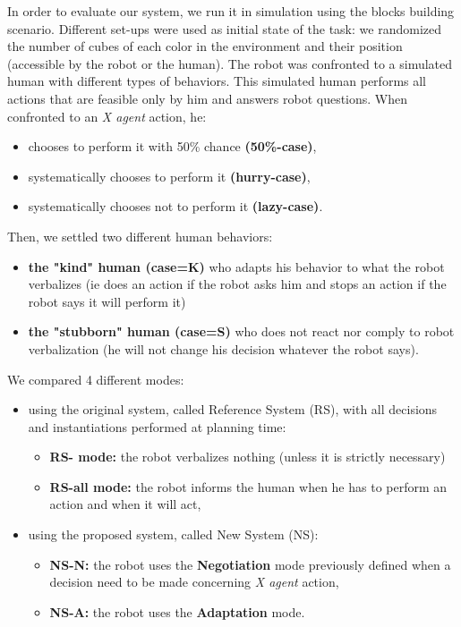 \documentclass[english,a4paper,11pt,twoside]{StyleThese}
\begin{document}
In order to evaluate our system, we run it in simulation using the blocks building scenario. Different set-ups were used as initial state of the task: we randomized the number of cubes of each color in the environment and their position (accessible by the robot or the human). The robot was confronted to a simulated human with different types of behaviors. This simulated human performs all actions that are feasible only by him and answers robot questions. When confronted to an \textit{X agent} action, he:
\begin{itemize}
\item chooses to perform it with 50\% chance \textbf{(50\%-case)},
\item systematically chooses to perform it \textbf{(hurry-case)},
\item systematically chooses not to perform it \textbf{(lazy-case)}.
\end{itemize}
Then, we settled two different human behaviors:
\begin{itemize}
\item \textbf{the "kind" human (case=K)} who adapts his behavior to what the robot verbalizes (ie does an action if the robot asks him and stops an action if the robot says it will perform it)
\item \textbf{the "stubborn" human (case=S)} who does not react nor comply to robot verbalization (he will not change his decision whatever the robot says).
\end{itemize}

We compared 4 different modes:
\begin{itemize}
\item using the original system, called Reference System (RS), with all decisions and instantiations performed at planning time:
\begin{itemize}
\item \textbf{RS- mode:} the robot verbalizes nothing (unless it is strictly necessary)
\item \textbf{RS-all mode:} the robot informs the human when he has to perform an action and when it will act,
\end{itemize}
\item using the proposed system, called New System (NS): 
\begin{itemize}
\item \textbf{NS-N:} the robot uses the \textbf{Negotiation} mode previously defined when a decision need to be made concerning \textit{X agent} action,
\item \textbf{NS-A:} the robot uses the \textbf{Adaptation} mode.
\end{itemize}
\end{itemize}
\end{document}
